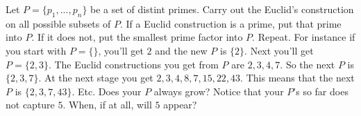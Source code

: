   Let $P = \{p_1, ..., p_n\}$ be a set of distint primes.
  Carry out the Euclid's construction on all possible subsets of $P$.
  If a Euclid construction is a prime, put that prime into $P$.
  If it does not, put the smallest prime factor into $P$.
  Repeat.
  For instance if you start with $P = \{\}$,
  you'll get $2$ and the new $P$ is $\{2\}$.
  Next you'll get $P = \{2, 3\}$.
  The Euclid constructions you get from $P$ are $2, 3, 4, 7$.
  So the next $P$ is $\{2, 3, 7\}$.
  At the next stage you get $2, 3, 4, 8, 7, 15, 22, 43$.
  This means that the next $P$ is $\{2, 3, 7, 43\}$.
  Etc.
  Does your $P$ always grow?
  Notice that your $P$'s so far does not capture $5$.
  When, if at all, will $5$ appear?
